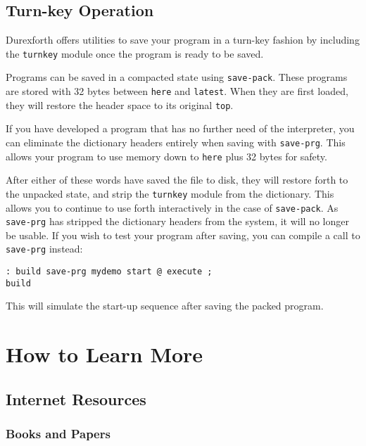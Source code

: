 \subsection{Turn-key Operation}

Durexforth offers utilities to save your program in a turn-key fashion by including the \texttt{turnkey} module once the program is ready to be saved.

Programs can be saved in a compacted state using \texttt{save-pack}. These programs are stored with 32 bytes between \texttt{here} and \texttt{latest}. When they are first loaded, they will restore the header space to its original \texttt{top}.

If you have developed a program that has no further need of the interpreter, you can eliminate the dictionary headers entirely when saving with \texttt{save-prg}. This allows your program to use memory down to \texttt{here} plus 32 bytes for safety.

After either of these words have saved the file to disk, they will restore forth to the unpacked state, and strip the \texttt{turnkey} module from the dictionary. This allows you to continue to use forth interactively in the case of \texttt{save-pack}. As \texttt{save-prg} has stripped the dictionary headers from the system, it will no longer be usable. If you wish to test your program after saving, you can compile a call to \texttt{save-prg} instead:
\begin{verbatim}
: build save-prg mydemo start @ execute ;
build
\end{verbatim}
This will simulate the start-up sequence after saving the packed program.

\section{How to Learn More}

\subsection{Internet Resources}

\subsubsection{Books and Papers}

